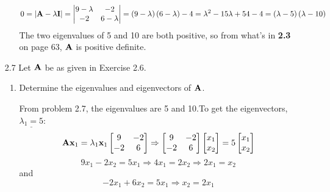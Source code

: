 \begin{enumerate}[font=\bfseries]
\begin{enumerate}
            \[
                0 = \left|\bold{A} - \lambda \bold{I}\right| =
                \left|\begin{matrix}
                    9-\lambda & -2 \\
                    -2 & 6-\lambda
                \end{matrix}
                \right| = \left(9 - \lambda\right)\left(6 - \lambda\right) - 4 = \lambda^2 - 15\lambda + 54 - 4 = \left(\lambda - 5\right)\left(\lambda - 10\right)
            \]
        The two eigenvalues of 5 and 10 are both positive, so from what's in \textbf{2.3} on page 63, $\bold{A}$ is positive definite.
        \end{enumerate}
        \item[2.7] Let $\bold{A}$ be as given in Exercise 2.6.
        \begin{enumerate}
            \item Determine the eigenvalues and eigenvectors of $\bold{A}$.
            \par
            From problem 2.7, the eigenvalues are 5 and 10.To get the eigenvectors,
            \newline
            $\underline{\lambda_1 = 5}$:
            \[
                \bold{A}\bold{x}_1 = \lambda_1 \bold{x}_1
                \begin{bmatrix}
                    9 & -2 \\
                    -2 & 6
                \end{bmatrix} \Rightarrow
                \begin{bmatrix}
                    9 & -2 \\
                    -2 & 6
                \end{bmatrix}
                \begin{bmatrix}
                    x_1 \\
                    x_2
                \end{bmatrix} = 
                5\begin{bmatrix}
                    x_1 \\
                    x_2
                \end{bmatrix}
            \]
            \[
                9x_1 - 2x_2 = 5x_1 \Rightarrow 4x_1 = 2x_2 \Rightarrow 2x_1 = x_2
            \]
            and
            \[
                -2x_1 + 6x_2 = 5x_1 \Rightarrow x_2 = 2x_1
\]
\end{enumerate}
\end{enumerate}
